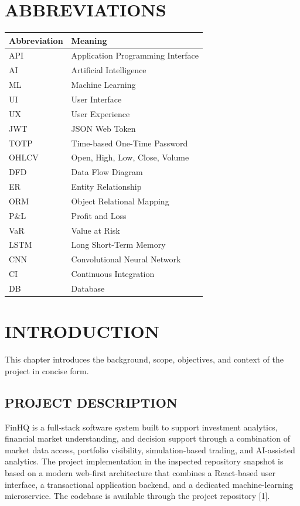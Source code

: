 \documentclass[12pt,a4paper]{report}
\newcommand{\projectshort}{FinHQ}
\begin{document}
\chapter*{ABBREVIATIONS}
\begin{longtable}{p{1.6in} p{4.6in}}
\textbf{Abbreviation} & \textbf{Meaning} \\
\hline
API & Application Programming Interface \\
AI & Artificial Intelligence \\
ML & Machine Learning \\
UI & User Interface \\
UX & User Experience \\
JWT & JSON Web Token \\
TOTP & Time-based One-Time Password \\
OHLCV & Open, High, Low, Close, Volume \\
DFD & Data Flow Diagram \\
ER & Entity Relationship \\
ORM & Object Relational Mapping \\
P\&L & Profit and Loss \\
VaR & Value at Risk \\
LSTM & Long Short-Term Memory \\
CNN & Convolutional Neural Network \\
CI & Continuous Integration \\
DB & Database \\
\end{longtable}
\clearpage

\setcounter{page}{1}
\pagestyle{reportstyle}

\chapter{INTRODUCTION}
This chapter introduces the background, scope, objectives, and context of the project in concise form.

\section{PROJECT DESCRIPTION}
\projectshort{} is a full-stack software system built to support investment analytics, financial market understanding, and decision support through a combination of market data access, portfolio visibility, simulation-based trading, and AI-assisted analytics. The project implementation in the inspected repository snapshot is based on a modern web-first architecture that combines a React-based user interface, a transactional application backend, and a dedicated machine-learning microservice. The codebase is available through the project repository [1].
\end{document}
